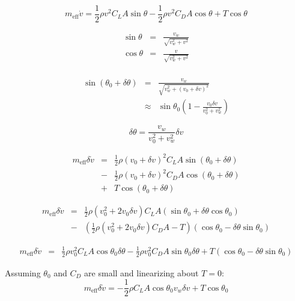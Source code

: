 \documentclass[11pt]{amsart}
\begin{document}
\begin{equation}
m_{\mathrm{eff}} \dot{v} =
\frac{1}{2} \rho v^2 C_L A \sin \theta -
\frac{1}{2} \rho v^2 C_D A \cos \theta +
T \cos \theta
\end{equation}

\begin{eqnarray}
  \sin \theta &=& \frac{v_w}{\sqrt{v_w^2 + v^2}} \\
  \cos \theta &=& \frac{v}{\sqrt{v_w^2 + v^2}} \\
\end{eqnarray}

\begin{eqnarray}
\sin (\theta_0 + \delta \theta) &=&
\frac{v_w}{\sqrt{v_w^2 + (v_0 + \delta v)^2}} \\
&\approx& \sin \theta_0 \left(1 - \frac{v_0 \delta v}{v_0^2 + v_w^2} \right)
\end{eqnarray}

\begin{equation}
\delta \theta = \frac{v_w}{v_0^2 + v_w^2} \delta v
\end{equation}

\begin{eqnarray}
m_{\mathrm{eff}} \delta \dot{v} &=&
\frac{1}{2} \rho (v_0 + \delta v)^2 C_L A \sin (\theta_0 + \delta \theta) \\
&-& \frac{1}{2} \rho (v_0 + \delta v)^2 C_D A \cos (\theta_0 + \delta \theta) \\
&+& T \cos (\theta_0 + \delta \theta)
\end{eqnarray}

\begin{eqnarray}
m_{\mathrm{eff}} \delta \dot{v} &=&
\frac{1}{2} \rho (v_0^2 + 2 v_0 \delta v) C_L A
(\sin \theta_0 + \delta \theta \cos \theta_0) \\
&-& \left(\frac{1}{2} \rho (v_0^2 + 2 v_0 \delta v) C_D A - T \right)
(\cos \theta_0 - \delta \theta \sin \theta_0)
\end{eqnarray}

\begin{eqnarray}
m_{\mathrm{eff}} \delta \dot{v} &=&
\frac{1}{2} \rho v_0^2 C_L A \cos \theta_0 \delta \theta -
\frac{1}{2} \rho v_0^2 C_D A \sin \theta_0 \delta \theta +
T (\cos \theta_0 - \delta \theta \sin \theta_0)
\end{eqnarray}

Assuming $\theta_0$ and $C_D$ are small and linearizing about $T = 0$:
\begin{equation}
m_{\mathrm{eff}} \delta \dot{v} =
-\frac{1}{2} \rho C_L A \cos \theta_0 v_w \delta v +
T \cos \theta_0
\end{equation}
\end{document}
